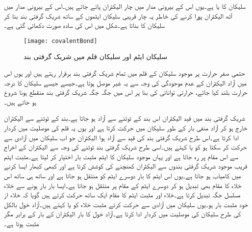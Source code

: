 سلیکان کا   یا  ہے۔یوں اس کے بیرونی مدار میں چار الیکٹران پائے جاتے ہیں۔اس کے بیرونی مدار میں آٹھ الیکٹران پورا کرنے کی خاطر یہ چار قریبی سلیکان ایٹموں کے ساتھ شریک گرفتی بند بنا کر سلیکان کا   بناتا ہے۔شکل   میں اس کی سادہ صورت دکھائی گئی ہے۔  
\begin{figure}
\centering
\texttt{[image: covalentBond]}
\caption{سلیکان ایٹم اور سلیکان قلم میں شریک گرفتی بند}
\label{شکل_سلیکان_ایٹم_اور_شریک_گرفتی_بند}
\end{figure}
حتمی صفر حرارت  پر موجود سلیکان کے قلم میں تمام شریک گرفتی بند برقرار رہتے ہیں اور یوں اس میں آزاد الیکٹران  کے عدم موجودگی کی وجہ سے یہ غیر موصل ہوتا ہے۔جیسے جیسے سلیکان کا درجہ حرارت بلند کیا جائے، حرارتی توانائی کی بنا پر اس میں جگہ جگہ شریک گرفتی بند منقطع ہونا شروع ہو جاتے ہیں۔

شریک گرفتی بند میں قید الیکٹران اس بند کے ٹوٹنے سے آزاد ہو جاتا ہے۔بند کے ٹوٹنے سے الیکٹران خارج ہو کر آزاد منفی بار کے طور  سلیکان میں حرکت کرتا ہے اور یوں یہ قلم کی موصلیت میں کردار ادا کرتا ہے۔اس طرح شریک گرفتی بند کی قید سے آزاد ہوا الیکٹران جو اب سلیکان میں آزادی سے حرکت کر سکتا ہو کو  یا   کہتے ہیں۔اسی طرح شریک گرفتی بند ٹوٹنے کی وجہ سے الیکٹران کے اخراج سے اس مقام پر  رہ جاتا ہے اور یہاں موجود سلیکان کا ایٹم مثبت بار اختیار کر لیتا ہے۔مثبت ایٹم قریب موجود شریک گرفتی بندوں سے الیکٹران کھنچنے کی کوشش کرتا ہے اور کبھی کبھار ایسا کرنے میں کامیاب ہو جاتا ہے۔یوں اس ایٹم کا بار دوسرے ایٹم کو منتقل ہو جاتا ہے اور ساتھ ہی ساتھ اس خلاء کا مقام بھی تبدیل ہو کر دوسرے ایٹم کے مقام پر منتقل ہو جاتا ہے۔ایسا بار بار ہونے سے خلاء مسلسل جگہ تبدیل کرتا ہے۔خلاء اور مثبت ایٹم کا مقام ایک ساتھ حرکت کرتے ہیں گویا کہ خلاء از خود مثبت بار ہو۔یوں سلیکان میں آزادی سے حرکت کرتے مثبت خلاء کو  یا   کہتے ہیں۔آزاد خول بالکل  کی طرح سلیکان کی موصلیت میں کردار ادا کرتا ہے۔آزاد خول کا بار الیکٹران کے بار کے برابر مگر مثبت ہوتا ہے۔

